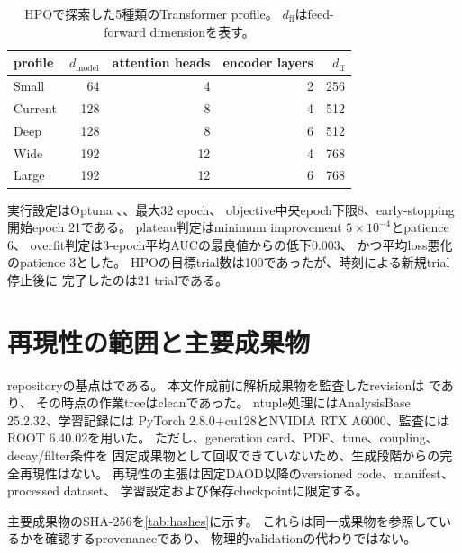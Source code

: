 \documentclass[xelatex,ja=standard,a4paper,10pt,twocolumn]{bxjsarticle}
\begin{document}
\begin{table}[tbp]
  \centering
  \caption{HPOで探索した5種類のTransformer profile。
    \(d_{\mathrm{ff}}\)はfeed-forward dimensionを表す。}
  \label{tab:model_profiles}
  \begin{tabular}{lrrrr}
    \toprule
    profile & \(d_{\mathrm{model}}\) & attention heads & encoder layers &
    \(d_{\mathrm{ff}}\) \\
    \midrule
    Small   &  64 &  4 & 2 & 256 \\
    Current & 128 &  8 & 4 & 512 \\
    Deep    & 128 &  8 & 6 & 512 \\
    Wide    & 192 & 12 & 4 & 768 \\
    Large   & 192 & 12 & 6 & 768 \\
    \bottomrule
  \end{tabular}
\end{table}

実行設定はOptuna 、、最大32 epoch、
objective中央epoch下限8、early-stopping開始epoch 21である。
plateau判定はminimum improvement \(5\times10^{-4}\)とpatience 6、
overfit判定は3-epoch平均AUCの最良値からの低下0.003、
かつ平均loss悪化のpatience 3とした。
HPOの目標trial数は100であったが、時刻による新規trial停止後に
完了したのは21 trialである。

\FloatBarrier
\section{再現性の範囲と主要成果物}
\label{app:reproducibility}

repositoryの基点はである。
本文作成前に解析成果物を監査したrevisionは
であり、
その時点の作業treeはcleanであった。
ntuple処理にはAnalysisBase 25.2.32、学習記録には
PyTorch 2.8.0+cu128とNVIDIA RTX A6000、監査にはROOT 6.40.02を用いた。
ただし、generation card、PDF、tune、coupling、decay/filter条件を
固定成果物として回収できていないため、生成段階からの完全再現性はない。
再現性の主張は固定DAOD以降のversioned code、manifest、processed dataset、
学習設定および保存checkpointに限定する。

主要成果物のSHA-256を\cref{tab:hashes}に示す。
これらは同一成果物を参照しているかを確認するprovenanceであり、
物理的validationの代わりではない。
\end{document}
